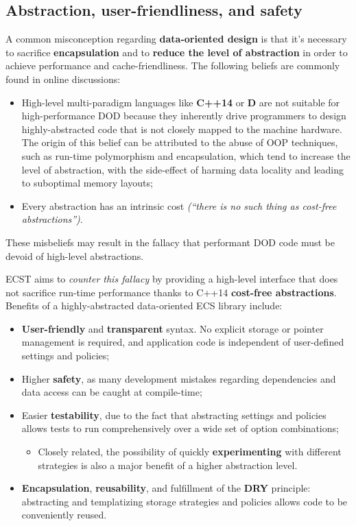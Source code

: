 \documentclass[oneside, 12pt, a4paper, openany]{book}
\providecommand{\tightlist}{%
  \setlength{\itemsep}{0pt}\setlength{\parskip}{0pt}}
\begin{document}
\subsection{Abstraction, user-friendliness, and
safety}\label{abstraction-user-friendliness-and-safety}

A common misconception regarding \textbf{data-oriented design} is that
it's necessary to sacrifice \textbf{encapsulation} and to \textbf{reduce
the level of abstraction} in order to achieve performance and
cache-friendliness. The following beliefs are commonly found in online
discussions:

\begin{itemize}
\item
  High-level multi-paradigm languages like \textbf{C++14} or \textbf{D}
  are not suitable for high-performance DOD because they inherently
  drive programmers to design highly-abstracted code that is not closely
  mapped to the machine hardware. The origin of this belief can be
  attributed to the abuse of OOP techniques, such as run-time
  polymorphism and encapsulation, which tend to increase the level of
  abstraction, with the side-effect of harming data locality and leading
  to suboptimal memory layouts;
\item
  Every abstraction has an intrinsic cost \emph{(``there is no such
  thing as cost-free abstractions'')}.
\end{itemize}

These misbeliefs may result in the fallacy that performant DOD code must
be devoid of high-level abstractions.

ECST aims to \emph{counter this fallacy} by providing a high-level
interface that does not sacrifice run-time performance thanks to C++14
\textbf{cost-free abstractions}. Benefits of a highly-abstracted
data-oriented ECS library include:

\begin{itemize}
\item
  \textbf{User-friendly} and \textbf{transparent} syntax. No explicit
  storage or pointer management is required, and application code is
  independent of user-defined settings and policies;
\item
  Higher \textbf{safety}, as many development mistakes regarding
  dependencies and data access can be caught at compile-time;
\item
  Easier \textbf{testability}, due to the fact that abstracting settings
  and policies allows tests to run comprehensively over a wide set of
  option combinations;

  \begin{itemize}
  \tightlist
  \item
    Closely related, the possibility of quickly \textbf{experimenting}
    with different strategies is also a major benefit of a higher
    abstraction level.
  \end{itemize}
\item
  \textbf{Encapsulation}, \textbf{reusability}, and fulfillment of the
  \textbf{DRY} principle: abstracting and templatizing storage
  strategies and policies allows code to be conveniently reused.
\end{itemize}
\end{document}
